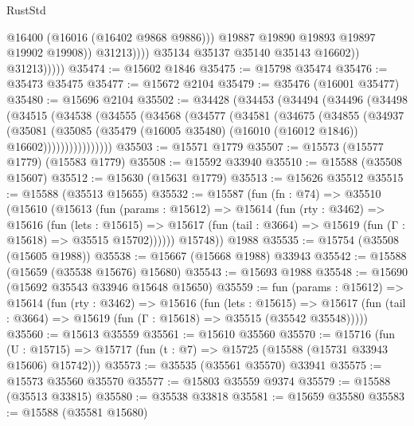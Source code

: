 \begin{lexlean}{RustStd}
\begin{coremodule}
                                @16400
                                (@16016 (@16402 @9868 @9886)))
                              @19887
                              @19890
                              @19893
                              @19897
                              @19902
                              @19908))
                          @31213))))
                  @35134
                  @35137
                  @35140
                  @35143
                  @16602))
              @31213)))))
@35474 := @15602 @1846
@35475 := @15798 @35474
@35476 := @35473 @35475
@35477 := @15672 @2104
@35479 := @35476 (@16001 @35477)
@35480 := @15696 @2104
@35502 := @34428
    (@34453
      (@34494
        (@34496
          (@34498
            (@34515
              (@34538
                (@34555
                  (@34568
                    (@34577
                      (@34581
                        (@34675
                          (@34855
                            (@34937
                              (@35081
                                (@35085
                                  (@35479
                                    (@16005 @35480)
                                    (@16010 (@16012 @1846))
                                    @16602))))))))))))))))
@35503 := @15571 @1779
@35507 := @15573 (@15577 @1779) (@15583 @1779)
@35508 := @15592 @33940
@35510 := @15588 (@35508 @15607)
@35512 := @15630 (@15631 @1779)
@35513 := @15626 @35512
@35515 := @15588 (@35513 @15655)
@35532 := @15587
    (fun (fn : @74) =>
    @35510
      (@15610
        (@15613
          (fun (params : @15612) =>
          @15614
            (fun (rty : @3462) =>
            @15616
              (fun (lets : @15615) =>
              @15617 (fun (tail : @3664) => @15619 (fun (Γ : @15618) => @35515 @15702))))))
        @15748))
    @1988
@35535 := @15754 (@35508 (@15605 @1988))
@35538 := @15667 (@15668 @1988) @33943
@35542 := @15588 (@15659 (@35538 @15676) @15680)
@35543 := @15693 @1988
@35548 := @15690 (@15692 @35543 @33946 @15648 @15650)
@35559 := fun (params : @15612) =>
  @15614
    (fun (rty : @3462) =>
    @15616
      (fun (lets : @15615) =>
      @15617 (fun (tail : @3664) => @15619 (fun (Γ : @15618) => @35515 (@35542 @35548)))))
@35560 := @15613 @35559
@35561 := @15610 @35560
@35570 := @15716
    (fun (U : @15715) => @15717 (fun (t : @7) => @15725 (@15588 (@15731 @33943 @15606) @15742)))
@35573 := @35535 (@35561 @35570) @33941
@35575 := @15573 @35560 @35570
@35577 := @15803 @35559 @9374
@35579 := @15588 (@35513 @33815)
@35580 := @35538 @33818
@35581 := @15659 @35580
@35583 := @15588 (@35581 @15680)

\end{coremodule}
\end{lexlean}
